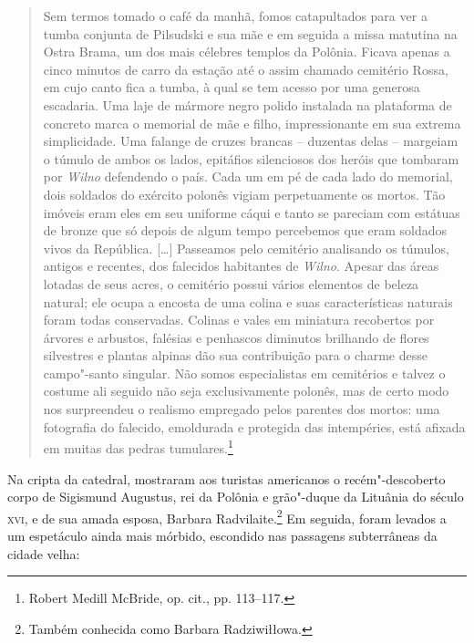 \begin{quote}
Sem termos tomado o café da manhã, fomos catapultados para ver a tumba
conjunta de Pilsudski e sua mãe e em seguida a missa matutina na Ostra
Brama, um dos mais célebres templos da Polônia. Ficava apenas a cinco
minutos de carro da estação até o assim chamado cemitério Rossa, em cujo
canto fica a tumba, à qual se tem acesso por uma generosa escadaria. Uma
laje de mármore negro polido instalada na plataforma de concreto marca o
memorial de mãe e filho, impressionante em sua extrema simplicidade. Uma
falange de cruzes brancas -- duzentas delas -- margeiam o túmulo de ambos
os lados, epitáfios silenciosos dos heróis que tombaram por \textit{Wilno}
defendendo o país. Cada um em pé de cada lado do memorial, dois soldados
do exército polonês vigiam perpetuamente os mortos. Tão imóveis eram
eles em seu uniforme cáqui e tanto se pareciam com estátuas de bronze
que só depois de algum tempo percebemos que eram soldados vivos da
República. [\ldots{}] Passeamos pelo cemitério analisando os túmulos,
antigos e recentes, dos falecidos habitantes de \textit{Wilno}. Apesar das áreas
lotadas de seus acres, o cemitério possui vários elementos de beleza
natural; ele ocupa a encosta de uma colina e suas características
naturais foram todas conservadas. Colinas e vales em miniatura
recobertos por árvores e arbustos, falésias e penhascos diminutos
brilhando de flores silvestres e plantas alpinas dão sua contribuição
para o charme desse campo"-santo singular. Não somos especialistas em
cemitérios e talvez o costume ali seguido não seja exclusivamente
polonês, mas de certo modo nos surpreendeu o realismo empregado pelos
parentes dos mortos: uma fotografia do falecido, emoldurada e protegida
das intempéries, está afixada em muitas das pedras tumulares.\footnote{Robert Medill McBride, op. cit., pp. 113--117.} 
\end{quote}

Na cripta da catedral, mostraram aos turistas americanos o
recém"-descoberto corpo de Sigismund Augustus, rei da Polônia e
grão"-duque da Lituânia do século \textsc{xvi}, e de sua amada esposa, Barbara
Radvilaite.\footnote{Também conhecida como Barbara Radziwiłłowa.} Em seguida, foram levados a um espetáculo
ainda mais mórbido, escondido nas passagens subterrâneas da cidade
velha:

